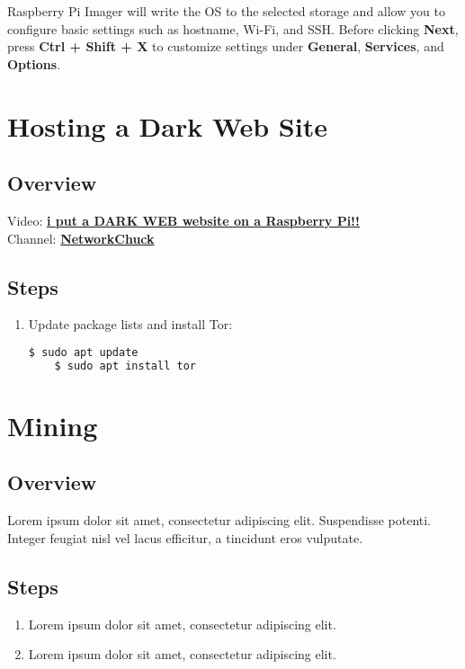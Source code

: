 \documentclass[a4paper,12pt]{article}
\begin{document}
Raspberry Pi Imager will write the OS to the selected storage and allow you to configure basic settings such as hostname, Wi-Fi, and SSH. Before clicking \textbf{Next}, press \textbf{Ctrl + Shift + X} to customize settings under \textbf{General}, \textbf{Services}, and \textbf{Options}.

\section{Hosting a Dark Web Site}

\subsection{Overview}
Video: \href{https://www.youtube.com/watch?v=bllS9tkCkaM}{\textbf{\color{blue}i put a DARK WEB website on a Raspberry Pi!!}} \\
Channel: \href{https://www.youtube.com/c/NetworkChuck}{\textbf{\color{blue}NetworkChuck}}

\subsection{Steps}
\begin{enumerate}
    \item Update package lists and install Tor:
    \begin{lstlisting}[language=bash, breaklines=true, columns=fullflexible]
    $ sudo apt update
    $ sudo apt install tor
    \end{lstlisting}
   
\end{enumerate}

\section{Mining}

\subsection{Overview}
Lorem ipsum dolor sit amet, consectetur adipiscing elit. Suspendisse potenti. Integer feugiat nisl vel lacus efficitur, a tincidunt eros vulputate.

\subsection{Steps}
\begin{enumerate}
    \item Lorem ipsum dolor sit amet, consectetur adipiscing elit.
    \item Lorem ipsum dolor sit amet, consectetur adipiscing elit.
\end{enumerate}
\end{document}
